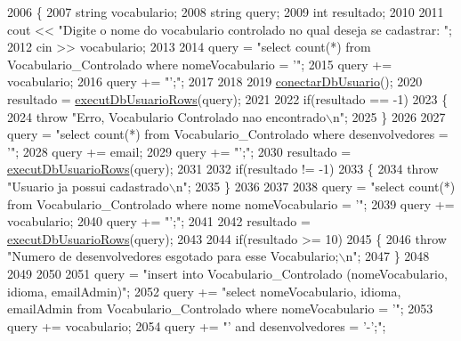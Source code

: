 \begin{DoxyCode}
2006 \{
2007   \textcolor{keywordtype}{string} vocabulario;
2008   \textcolor{keywordtype}{string} query;
2009   \textcolor{keywordtype}{int} resultado;
2010 
2011       cout << \textcolor{stringliteral}{"Digite o nome do vocabulario controlado no qual deseja se cadastrar: "};
2012       cin >> vocabulario;
2013 
2014       query = \textcolor{stringliteral}{"select count(*) from Vocabulario\_Controlado where nomeVocabulario = '"};
2015       query += vocabulario;
2016       query += \textcolor{stringliteral}{"';"};
2017 
2018 
2019       \mbox{\hyperlink{comando_sql_8cpp_a4f89ddcbc4cf8f2587d89f72f8c7900d}{conectarDbUsuario}}();
2020       resultado = \mbox{\hyperlink{comando_sql_8cpp_af54952694f2fa7d76f969fb74b853cb9}{executDbUsuarioRows}}(query);
2021 
2022       \textcolor{keywordflow}{if}(resultado == -1)
2023       \{
2024         \textcolor{keywordflow}{throw} \textcolor{stringliteral}{"Erro, Vocabulario Controlado nao encontrado\(\backslash\)n"};
2025       \}
2026 
2027         query = \textcolor{stringliteral}{"select count(*) from Vocabulario\_Controlado where desenvolvedores = '"};
2028         query += email;
2029         query += \textcolor{stringliteral}{"';"};
2030         resultado = \mbox{\hyperlink{comando_sql_8cpp_af54952694f2fa7d76f969fb74b853cb9}{executDbUsuarioRows}}(query);
2031 
2032         \textcolor{keywordflow}{if}(resultado != -1)
2033         \{
2034           \textcolor{keywordflow}{throw} \textcolor{stringliteral}{"Usuario ja possui cadastrado\(\backslash\)n"};
2035         \}
2036 
2037 
2038         query = \textcolor{stringliteral}{"select count(*) from Vocabulario\_Controlado where nome nomeVocabulario = '"};
2039         query += vocabulario;
2040         query += \textcolor{stringliteral}{"';"};
2041 
2042         resultado = \mbox{\hyperlink{comando_sql_8cpp_af54952694f2fa7d76f969fb74b853cb9}{executDbUsuarioRows}}(query);
2043 
2044         \textcolor{keywordflow}{if}(resultado >= 10)
2045         \{
2046           \textcolor{keywordflow}{throw} \textcolor{stringliteral}{"Numero de desenvolvedores esgotado para esse Vocabulario;\(\backslash\)n"};
2047         \}
2048 
2049 
2050 
2051         query = \textcolor{stringliteral}{"insert into Vocabulario\_Controlado (nomeVocabulario, idioma, emailAdmin)"};
2052         query += \textcolor{stringliteral}{"select nomeVocabulario, idioma, emailAdmin from Vocabulario\_Controlado where
       nomeVocabulario = '"};
2053         query += vocabulario;
2054         query += \textcolor{stringliteral}{"' and desenvolvedores = '-';"};

\end{DoxyCode}
